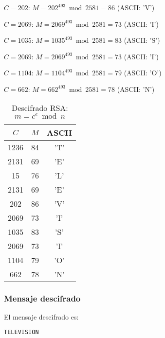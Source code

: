 $C = 202$: $M = 202^{493} \bmod 2581 = 86$ (ASCII: 'V')

$C = 2069$: $M = 2069^{493} \bmod 2581 = 73$ (ASCII: 'I')

$C = 1035$: $M = 1035^{493} \bmod 2581 = 83$ (ASCII: 'S')

$C = 2069$: $M = 2069^{493} \bmod 2581 = 73$ (ASCII: 'I')

$C = 1104$: $M = 1104^{493} \bmod 2581 = 79$ (ASCII: 'O')

$C = 662$: $M = 662^{493} \bmod 2581 = 78$ (ASCII: 'N')

\begin{table}[h]
\centering
\begin{tabular}{|c|c|c|}
\hline
$C$ & $M$ & ASCII \\ \hline
1236 & 84 & 'T' \\ \hline
2131 & 69 & 'E' \\ \hline
15 & 76 & 'L' \\ \hline
2131 & 69 & 'E' \\ \hline
202 & 86 & 'V' \\ \hline
2069 & 73 & 'I' \\ \hline
1035 & 83 & 'S' \\ \hline
2069 & 73 & 'I' \\ \hline
1104 & 79 & 'O' \\ \hline
662 & 78 & 'N' \\ \hline
\end{tabular}
\caption{Descifrado RSA: $m = c^e \bmod n$}
\label{tab:descifrado}
\end{table}
\subsubsection{Mensaje descifrado}

El mensaje descifrado es:

\begin{verbatim}
TELEVISION
\end{verbatim}